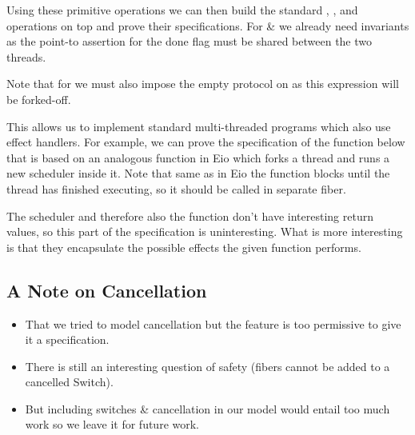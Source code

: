 
Using these primitive operations we can then build the standard , , and  operations on top and prove their specifications.
For  \&  we already need invariants as the point-to assertion for the done flag must be shared between the two threads.





Note that for  we must also impose the empty protocol on  as this expression will be forked-off.

This allows us to implement standard multi-threaded programs which also use effect handlers.
For example, we can prove the specification of the function below that is based on an analogous function in Eio which forks a thread and runs a new scheduler inside it.
Note that same as in Eio the function blocks until the thread has finished executing, so it should be called in separate fiber.



The scheduler  and therefore also the  function don't have interesting return values, so this part of the specification is uninteresting.
What is more interesting is that they encapsulate the possible effects the given function  performs.

\subsection{A Note on Cancellation}
\label{sec:apdx-cancellation}

\begin{itemize}
  \item That we tried to model cancellation but the feature is too permissive to give it a specification.
  \item There is still an interesting question of safety (fibers cannot be added to a cancelled Switch).
  \item But including switches \& cancellation in our model would entail too much work so we leave it for future work.
\end{itemize}
